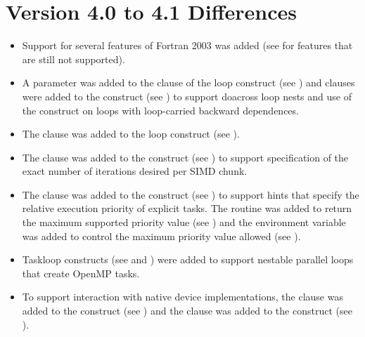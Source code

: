 \section{Version 4.0 to 4.1 Differences}
\label{sec:Version 4.0 to 4.1 Differences}
\begin{itemize}
\item Support for several features of Fortran 2003 was added (see 
       for features that are still 
      not supported).

\item A parameter was added to the  clause of the loop construct 
      (see ) and clauses were added to the 
       construct (see ) to 
      support doacross loop nests and use of the  construct on 
      loops with loop-carried backward dependences. 

\item The  clause was added to the loop construct 
      (see ).

\item The  clause was added to the  construct
      (see ) to support specification of 
      the exact number of iterations desired per SIMD chunk. 

\item The  clause was added to the  construct
      (see ) to support hints that specify
      the relative execution priority of explicit tasks. The 
       routine was added to return
      the maximum supported priority value (see 
      ) and the 
       environment variable was added to
      control the maximum priority value allowed (see 
      ).

\item Taskloop constructs (see  and 
      ) were added to support 
      nestable parallel loops that create OpenMP tasks. 

\item To support interaction with native device implementations, the 
       clause was added to the 
      construct (see ) and the 
       clause was added to the  construct
      (see ).


\end{itemize}
